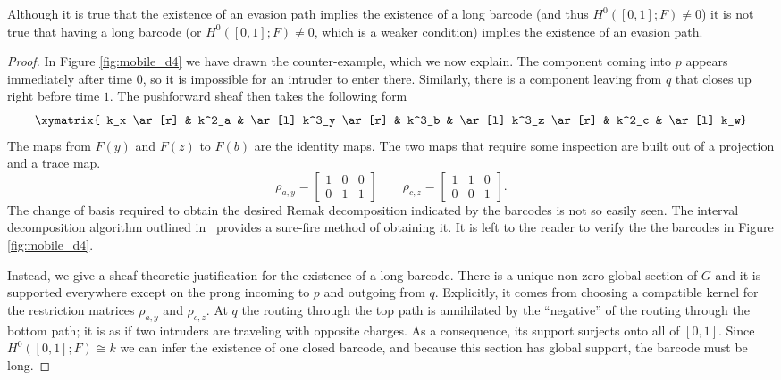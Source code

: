 \begin{prop}\label{prop:mobile_d4}
	Although it is true that the existence of an evasion path implies the existence of a long barcode (and thus $H^0([0,1];F)\neq 0$) it is not true that having a long barcode (or $H^0([0,1];F)\neq 0$, which is a weaker condition) implies the existence of an evasion path.
\end{prop}
\begin{proof}
	In Figure \ref{fig:mobile_d4} we have drawn the counter-example, which we now explain. The component coming into $p$ appears immediately after time $0$, so it is impossible for an intruder to enter there. Similarly, there is a component leaving from $q$ that closes up right before time $1$. The pushforward sheaf then takes the following form
	\[
		\xymatrix{	k_x  \ar[r] & k^2_a & \ar[l] k^3_y \ar[r] &  k^3_b & \ar[l] k^3_z \ar[r] &  k^2_c & \ar[l]  k_w}
	\]
	The maps from $F(y)$ and $F(z)$ to $F(b)$ are the identity maps. The two maps that require some inspection are built out of a projection and a trace map.
	\[
		\rho_{a,y}=\begin{bmatrix}1 & 0 & 0 \\0 & 1 & 1\end{bmatrix} \qquad \rho_{c,z}=\begin{bmatrix}1 & 1 & 0 \\0 & 0 & 1\end{bmatrix}.
	\]
	The change of basis required to obtain the desired Remak decomposition indicated by the barcodes is not so easily seen. The interval decomposition algorithm outlined in~\cite{zigzag} provides a sure-fire method of obtaining it. It is left to the reader to verify the the barcodes in Figure \ref{fig:mobile_d4}.
	
	Instead, we give a sheaf-theoretic justification for the existence of a long barcode. There is a unique non-zero global section of $G$ and it is supported everywhere except on the prong incoming to $p$ and outgoing from $q$. Explicitly, it comes from choosing a compatible kernel for the restriction matrices $\rho_{a,y}$ and $\rho_{c,z}$. At $q$ the routing through the top path is annihilated by the ``negative'' of the routing through the bottom path; it is as if two intruders are traveling with opposite charges. As a consequence, its support surjects onto all of $[0,1]$. Since $H^0([0,1];F)\cong k$ we can infer the existence of one closed barcode, and because this section has global support, the barcode must be long.
\end{proof}

